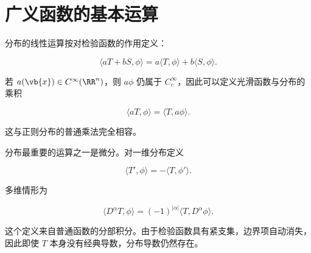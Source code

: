 \section{广义函数的基本运算}
\label{sec:distribution-operations}

分布的线性运算按对检验函数的作用定义：

\[
\langle aT+bS,\phi\rangle
=a\langle T,\phi\rangle+b\langle S,\phi\rangle.
\]

若 $a(\vb{x})\in C^\infty(\RR^n)$，则 $a\phi$ 仍属于 $C_c^\infty$，因此可以定义光滑函数与分布的乘积

\[
{
\langle aT,\phi\rangle
=\langle T,a\phi\rangle
}.
\]

这与正则分布的普通乘法完全相容。

分布最重要的运算之一是微分。对一维分布定义

\begin{equation*}{
\langle T',\phi\rangle=-\langle T,\phi'\rangle
}.\end{equation*}

多维情形为

\[
{
\langle D^\alpha T,\phi\rangle
=(-1)^{|\alpha|}\langle T,D^\alpha\phi\rangle
}.
\]

这个定义来自普通函数的分部积分。由于检验函数具有紧支集，边界项自动消失，因此即使 $T$ 本身没有经典导数，分布导数仍然存在。

